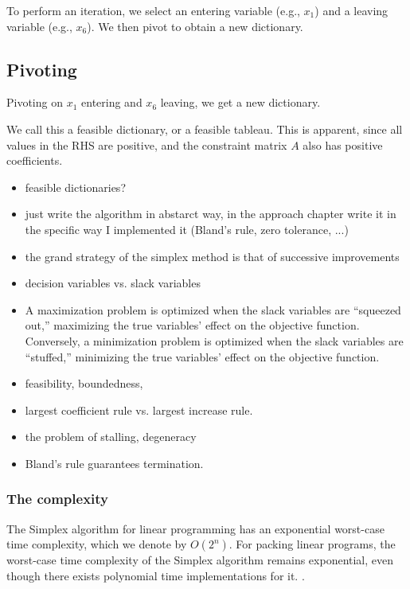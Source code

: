 To perform an iteration, we select an 
entering variable (e.g., \(x_1\)) and a 
leaving variable (e.g., \(x_6\)). 
We then pivot to obtain a new dictionary.

\subsection{Pivoting}

Pivoting on \(x_1\) entering and \(x_6\) leaving, 
we get a new dictionary.

  We call this a feasible dictionary\parencite{chvatal1983linear}, or a feasible tableau. This is apparent, since all
  values in the RHS are positive, and the constraint matrix $A$ also has positive coefficients.
  \begin{itemize}
      \item feasible dictionaries? 
      \item just write the algorithm in abstarct way, in the approach chapter write it in the 
      specific way I implemented it (Bland's rule, zero tolerance, ...)
      \item the grand strategy of the simplex method is that of successive improvements
      \item decision variables vs. slack variables
      \item A maximization problem is optimized when the slack variables are “squeezed out,” maximizing the true variables’ effect on the objective function. Conversely, a minimization problem is optimized when the slack variables are “stuffed,” 
      minimizing the true variables’ effect on the objective function.
      \item feasibility, boundedness, 
      \item largest coefficient rule vs. largest increase rule.
      \item the problem of stalling, degeneracy
      \item Bland's rule guarantees termination.
      
  \end{itemize}
  
  \subsubsection{The complexity}
  The Simplex algorithm for linear programming has an 
  exponential worst-case time complexity, which we denote by \( O(2^n) \).
  For packing linear programs, the worst-case time complexity of the Simplex algorithm 
  remains exponential, even though there exists polynomial time implementations for it.
  \parencite{stille2010solution}.
  

